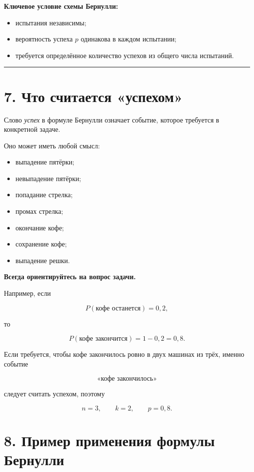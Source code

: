 \documentclass[a4paper,12pt]{article}
\newcommand{\accentline}{%
    \par\noindent
    {\color{accent}\rule{\linewidth}{0.7pt}}
    \par
}
\newcommand{\key}[1]{\textbf{\color{darkaccent}#1}}
\begin{document}
\key{Ключевое условие схемы Бернулли:}

\begin{itemize}
    \item испытания независимы;
    \item вероятность успеха $p$ одинакова в каждом испытании;
    \item требуется определённое количество успехов из общего числа испытаний.
\end{itemize}

\accentline

\section*{\color{darkaccent}7. Что считается «успехом»}

Слово \emph{успех} в формуле Бернулли означает событие, которое требуется в конкретной задаче.

Оно может иметь любой смысл:

\begin{itemize}
    \item выпадение пятёрки;
    \item невыпадение пятёрки;
    \item попадание стрелка;
    \item промах стрелка;
    \item окончание кофе;
    \item сохранение кофе;
    \item выпадение решки.
\end{itemize}

\key{Всегда ориентируйтесь на вопрос задачи.}

Например, если

\[
P(\text{кофе останется})=0{,}2,
\]

то

\[
P(\text{кофе закончится})
=
1-0{,}2
=
0{,}8.
\]

Если требуется, чтобы кофе закончилось ровно в двух машинах из трёх, именно событие

\[
\text{«кофе закончилось»}
\]

следует считать успехом, поэтому

\[
n=3,\qquad k=2,\qquad p=0{,}8.
\]

\section*{\color{darkaccent}8. Пример применения формулы Бернулли}
\end{document}
